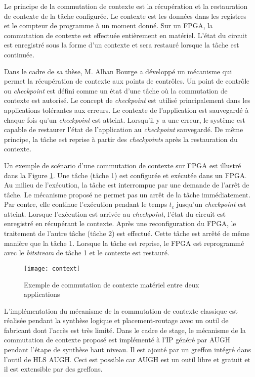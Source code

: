 Le principe de la commutation de contexte est la récupération et la restauration de contexte de la tâche configurée. 
Le contexte est les données dans les registres et le compteur de programme à un moment donné.
Sur un FPGA, la commutation de contexte est effectuée entièrement en matériel. L'état du circuit est enregistré
sous la forme d'un contexte et sera restauré lorsque la tâche est continuée.

Dans le cadre de sa thèse, M. Alban Bourge a développé un mécanisme qui permet la récupération de contexte aux points de contrôles.
Un point de contrôle ou \emph{checkpoint} est défini comme un état d'une tâche où la commutation de contexte est 
autorisé\cite{Bourge2015}. Le concept de \emph{checkpoint} est utilisé principalement dans les applications tolérantes aux erreurs. Le contexte
de l'application est sauvegardé à chaque fois qu'un \emph{checkpoint} est atteint. Lorsqu'il y a une erreur, le système est capable de restaurer
l'état de l'application au \emph{checkpoint} sauvegardé.
De même principe, la tâche est reprise à partir des \emph{checkpoints} après la restauration du contexte.


Un exemple de scénario d'une commutation de contexte sur FPGA est illustré dans la Figure \ref{fig:switch}.
Une tâche (tâche 1) est configurée et exécutée dans un FPGA. Au milieu de l'exécution, la tâche est interrompue par
une demande de l'arrêt de tâche.
Le mécanisme proposé ne permet pas un arrêt de la tâche immédiatement. Par contre, elle continue l'exécution pendant
le temps $t_c$ jusqu'un \emph{checkpoint} est atteint. Lorsque l'exécution est arrivée au \emph{checkpoint},
l'état du circuit est enregistré en récupérant le contexte. Après une reconfiguration du FPGA, le traitement de l'autre tâche (tâche 2)
est effectué. Cette tâche est arrêté de même manière que la tâche 1. Lorsque la tâche est reprise, le FPGA
est reprogrammé avec le \emph{bitstream} de tâche 1 et le contexte est restauré.

\begin{figure}[h]
	\centering
	\texttt{[image: context]}
	\caption{Exemple de commutation de contexte matériel entre deux applications\cite{Bourge2015}}
	\label{fig:switch}
	\vspace{-2mm}
\end{figure}

L'implémentation du mécanisme de la commutation de contexte classique est réalisée pendant la synthèse logique
et placement-routage avec un outil de fabricant dont l'accès est très limité.
Dans le cadre de stage, le mécanisme de la commutation de contexte proposé est implémenté à l'IP généré par AUGH
pendant l'étape de synthèse haut niveau. Il est ajouté par un greffon intégré dans l'outil de HLS AUGH.
Ceci est possible car AUGH est un outil libre et gratuit et il est extensible par des greffons.

